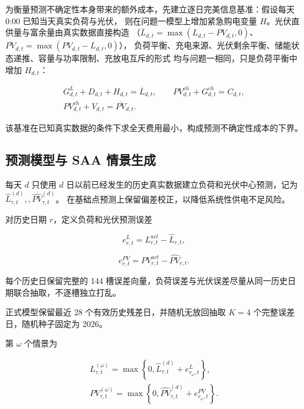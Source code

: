 为衡量预测不确定性本身带来的额外成本，先建立逐日完美信息基准：假设每天 0:00 已知当天真实负荷与光伏，
则在问题一模型上增加紧急购电变量 \(H\)。光伏直供量与富余量由真实数据直接构造
（\(\overline L_{d,t}=\max(L_{d,t}-PV_{d,t},0)\)、\(\overline{PV}_{d,t}=\max(PV_{d,t}-L_{d,t},0)\)），
负荷平衡、充电来源、光伏剩余平衡、储能状态递推、容量与功率限制、充放电互斥的形式
均与问题一相同，只是负荷平衡中增加 \(H_{d,t}\)：

\begin{equation}
\begin{gathered}
G^L_{d,t}+D_{d,t}+H_{d,t}=\overline L_{d,t},
\qquad
PV^{ch}_{d,t}+G^{ch}_{d,t}=C_{d,t},\\
PV^{ch}_{d,t}+V_{d,t}=\overline{PV}_{d,t}.
\end{gathered}
\end{equation}

该基准在已知真实数据的条件下求全天费用最小，构成预测不确定性成本的下界。

\subsection{预测模型与 SAA 情景生成}

每天 \(d\) 只使用 \(d\) 日以前已经发生的历史真实数据建立负荷和光伏中心预测，记为 \(\hat L_{\tau,t}^{(d)},, \widehat{PV}_{\tau,t}^{(d)}\)。 在基础点预测上保留偏差校正，以降低系统性供电不足风险。

对历史日期 \(r\)，定义负荷和光伏预测误差

\[
e^L_{r,t}
=
L_{r,t}^{act}
-
\hat L_{r,t},
\]

\begin{equation}
e^{PV}_{r,t}
=
PV_{r,t}^{act}
-
\widehat{PV}_{r,t}.
\end{equation}

每个历史日保留完整的 144 槽误差向量，负荷误差与光伏误差尽量从同一历史日期联合抽取，不逐槽独立打乱。

正式模型保留最近 28 个有效历史残差日，并随机无放回抽取 \(K=4\) 个完整误差日，随机种子固定为 2026。

第 \(\omega\) 个情景为

\begin{equation}
\begin{gathered}
L_{\tau,t}^{(\omega)}
=
\max
\left\{
0,
\hat L_{\tau,t}^{(d)}
+
e^L_{r_\omega,t}
\right\},\\
PV_{\tau,t}^{(\omega)}
=
\max
\left\{
0,
\widehat{PV}_{\tau,t}^{(d)}
+
e^{PV}_{r_\omega,t}
\right\}.
\end{gathered}
\end{equation}

